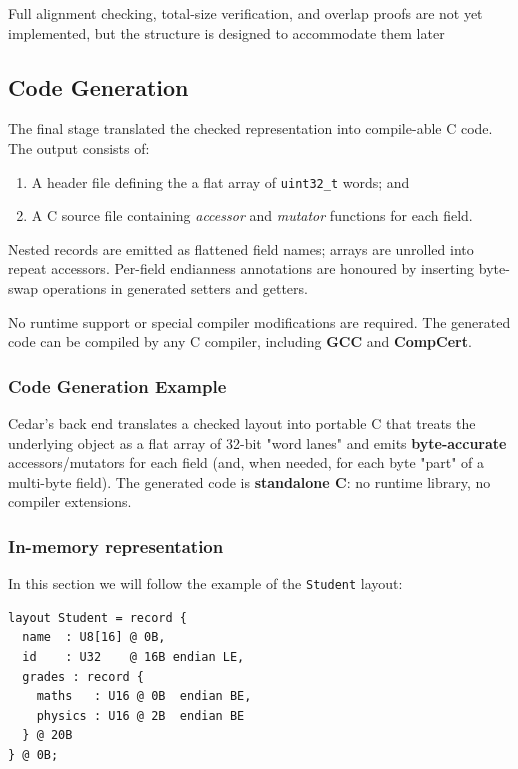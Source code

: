 Full alignment checking, total-size verification, and overlap proofs are
not yet implemented, but the structure is designed to accommodate them later

\subsection{Code Generation}
The final stage translated the checked representation into compile-able C code.
The output consists of:
\begin{enumerate}
    \item A header file defining the a flat array of \texttt{uint32\_t} words;
    and
    \item A C source file containing \textit{accessor} and \textit{mutator}
    functions for each field.
\end{enumerate}

Nested records are emitted as flattened field names; arrays are unrolled into
repeat accessors. Per-field endianness annotations are honoured by inserting
byte-swap operations in generated setters and getters.

No runtime support or special compiler modifications are required. The generated
code can be compiled by any C compiler, including \textbf{GCC} and \textbf{CompCert}.

\subsubsection{Code Generation Example}
Cedar's back end translates a checked layout into portable C that
treats the underlying object as a flat array of 32-bit "word lanes"
and emits \textbf{byte-accurate} accessors/mutators for each field (and,
when needed, for each byte "part" of a multi-byte field). The generated
code is \textbf{standalone C}: no runtime library, no compiler extensions.

\subsubsection{In-memory representation}
In this section we will follow the example of the \texttt{Student} layout:
\begin{lstlisting}[caption={Cedar layout example}, label={lst:student_layout}]
layout Student = record {
  name  : U8[16] @ 0B,
  id    : U32    @ 16B endian LE,
  grades : record {
    maths   : U16 @ 0B  endian BE,
    physics : U16 @ 2B  endian BE
  } @ 20B
} @ 0B;
\end{lstlisting}

